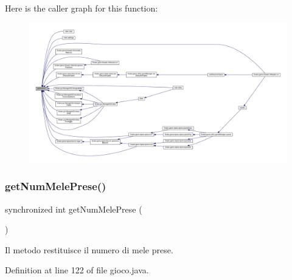 Here is the caller graph for this function\+:
\nopagebreak
\begin{figure}[H]
\begin{center}
\leavevmode
\includegraphics[width=350pt]{class_snake_1_1game_1_1gioco_aeab124c2ec716095907dd38891f8163d_icgraph}
\end{center}
\end{figure}
\mbox{\label{class_snake_1_1game_1_1gioco_ab5f0b7048deda3c739c67b65166283cc}} 
\subsubsection{\texorpdfstring{get\+Num\+Mele\+Prese()}{getNumMelePrese()}}
{\footnotesize\ttfamily synchronized int get\+Num\+Mele\+Prese (\begin{DoxyParamCaption}{ }\end{DoxyParamCaption})}



Il metodo restituisce il numero di mele prese. 



Definition at line 122 of file gioco.\+java.

